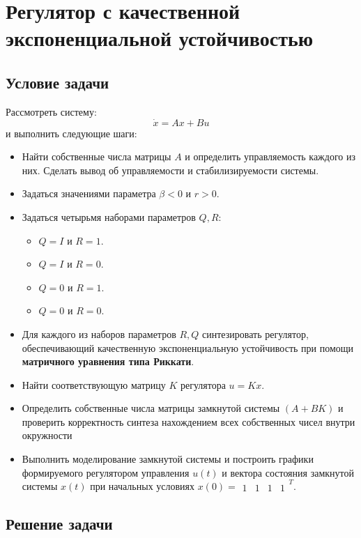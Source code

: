 \chapter{Регулятор с качественной экспоненциальной устойчивостью}
\label{ch:chap3}
\section{Условие задачи}

Рассмотреть систему:
$$
    \dot{x} = Ax + Bu  
$$ и выполнить следующие шаги:
  \begin{itemize}
  \item  Найти собственные числа матрицы $A$ и определить управляемость каждого из
  них. Сделать вывод об управляемости и стабилизируемости системы.
  \item  Задаться значениями параметра $\beta < 0$ и $r > 0$.
  \item Задаться четырьмя наборами параметров $Q,R$: 
  \begin{itemize}
      \item  $Q=I$ и $R = 1$.
      \item  $Q=I$ и $R = 0$.
      \item  $Q=0$ и $R = 1$.
      \item  $Q=0$ и $R = 0$.
  \end{itemize}
  \item Для каждого из наборов параметров $R,Q$ синтезировать регулятор, обеспечивающий 
  качественную экспоненциальную устойчивость при помощи \textbf{матричного уравнения типа Риккати}.
  \item Найти соответствующую матрицу $K$ регулятора $u = Kx$.
  \item Определить собственные числа матрицы замкнутой системы $(A+BK)$ и проверить корректность синтеза нахождением всех собственных чисел внутри окружности
  \item Выполнить моделирование замкнутой системы и построить  графики формируемого регулятором управления $u(t)$ и вектора состояния
  замкнутой системы $x(t)$ при начальных условиях $x(0) = \begin{matrix} 1&1&1&1 \end{matrix}^T$.
 
  \end{itemize}
      
\section{Решение задачи}

